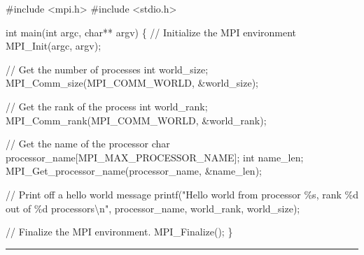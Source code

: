 \documentclass[
  letterpaper,
  DIV=11,
  numbers=noendperiod]{scrartcl}
\newenvironment{Shaded}{\begin{snugshade}}{\end{snugshade}}
\newcommand{\CommentTok}[1]{\textcolor[rgb]{0.37,0.37,0.37}{#1}}
\newcommand{\DataTypeTok}[1]{\textcolor[rgb]{0.68,0.00,0.00}{#1}}
\newcommand{\ImportTok}[1]{\textcolor[rgb]{0.00,0.46,0.62}{#1}}
\newcommand{\NormalTok}[1]{\textcolor[rgb]{0.00,0.23,0.31}{#1}}
\newcommand{\OperatorTok}[1]{\textcolor[rgb]{0.37,0.37,0.37}{#1}}
\newcommand{\PreprocessorTok}[1]{\textcolor[rgb]{0.68,0.00,0.00}{#1}}
\newcommand{\SpecialCharTok}[1]{\textcolor[rgb]{0.37,0.37,0.37}{#1}}
\newcommand{\StringTok}[1]{\textcolor[rgb]{0.13,0.47,0.30}{#1}}
\begin{document}
\begin{Shaded}
\begin{Highlighting}[]
\PreprocessorTok{\#include }\ImportTok{\textless{}mpi.h\textgreater{}}
\PreprocessorTok{\#include }\ImportTok{\textless{}stdio.h\textgreater{}}

\DataTypeTok{int}\NormalTok{ main}\OperatorTok{(}\DataTypeTok{int}\NormalTok{ argc}\OperatorTok{,} \DataTypeTok{char}\OperatorTok{**}\NormalTok{ argv}\OperatorTok{)} \OperatorTok{\{}
    \CommentTok{// Initialize the MPI environment}
\NormalTok{    MPI\_Init}\OperatorTok{(}\NormalTok{argc}\OperatorTok{,}\NormalTok{ argv}\OperatorTok{);}

    \CommentTok{// Get the number of processes}
    \DataTypeTok{int}\NormalTok{ world\_size}\OperatorTok{;}
\NormalTok{    MPI\_Comm\_size}\OperatorTok{(}\NormalTok{MPI\_COMM\_WORLD}\OperatorTok{,} \OperatorTok{\&}\NormalTok{world\_size}\OperatorTok{);}

    \CommentTok{// Get the rank of the process}
    \DataTypeTok{int}\NormalTok{ world\_rank}\OperatorTok{;}
\NormalTok{    MPI\_Comm\_rank}\OperatorTok{(}\NormalTok{MPI\_COMM\_WORLD}\OperatorTok{,} \OperatorTok{\&}\NormalTok{world\_rank}\OperatorTok{);}

    \CommentTok{// Get the name of the processor}
    \DataTypeTok{char}\NormalTok{ processor\_name}\OperatorTok{[}\NormalTok{MPI\_MAX\_PROCESSOR\_NAME}\OperatorTok{];}
    \DataTypeTok{int}\NormalTok{ name\_len}\OperatorTok{;}
\NormalTok{    MPI\_Get\_processor\_name}\OperatorTok{(}\NormalTok{processor\_name}\OperatorTok{,} \OperatorTok{\&}\NormalTok{name\_len}\OperatorTok{);}

    \CommentTok{// Print off a hello world message}
\NormalTok{    printf}\OperatorTok{(}\StringTok{"Hello world from processor }\SpecialCharTok{\%s}\StringTok{, rank }\SpecialCharTok{\%d}\StringTok{ out of }\SpecialCharTok{\%d}\StringTok{ processors}\SpecialCharTok{\textbackslash{}n}\StringTok{"}\OperatorTok{,}
\NormalTok{           processor\_name}\OperatorTok{,}\NormalTok{ world\_rank}\OperatorTok{,}\NormalTok{ world\_size}\OperatorTok{);}

    \CommentTok{// Finalize the MPI environment.}
\NormalTok{    MPI\_Finalize}\OperatorTok{();}
\OperatorTok{\}} 
\end{Highlighting}
\end{Shaded}

\begin{center}\rule{0.5\linewidth}{0.5pt}\end{center}
\end{document}
